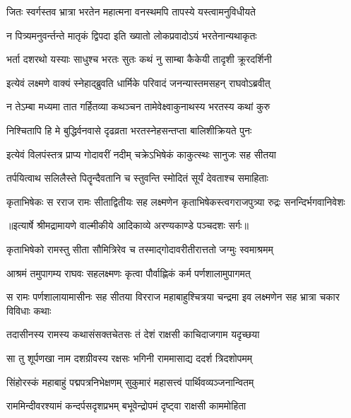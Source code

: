 \twolineshloka
{जितः स्वर्गस्तव भ्रात्रा भरतेन महात्मना}
{वनस्थमपि तापस्ये यस्त्वामनुविधीयते} %

\twolineshloka
{न पित्र्यमनुवर्न्तन्ते मातृकं द्विपदा इति}
{ख्यातो लोकप्रवादोऽयं भरतेनान्यथाकृतः} %

\twolineshloka
{भर्ता दशरथो यस्याः साधुश्च भरतः सुतः}
{कथं नु साम्बा कैकेयी तादृशी क्रूरदर्शिनी} %

\twolineshloka
{इत्येवं लक्ष्मणे वाक्यं स्नेहाद्ब्रुवति धार्मिके}
{परिवादं जनन्यास्तमसहन् राघवोऽब्रवीत्} %

\twolineshloka
{न तेऽम्बा मध्यमा तात गर्हितव्या कथञ्चन}
{तामेवेक्ष्वाकुनाथस्य भरतस्य कथां कुरु} %

\twolineshloka
{निश्चितापि हि मे बुद्धिर्वनवासे दृढव्रता}
{भरतस्नेहसन्तप्ता बालिशीक्रियते पुनः} %

\twolineshloka
{इत्येवं विलपंस्तत्र प्राप्य गोदावरीं नदीम्}
{चक्रेऽभिषेकं काकुत्स्थः सानुजः सह सीतया} %

\twolineshloka
{तर्पयित्वाथ सलिलैस्ते पितॄन्दैवतानि च}
{स्तुवन्ति स्मोदितं सूर्यं देवताश्च समाहिताः} %

\fourlineindentedshloka
{कृताभिषेकः स रराज रामः}
{सीताद्वितीयः सह लक्ष्मणेन}
{कृताभिषेकस्त्वगराजपुत्र्या}
{रुद्रः सनन्दिर्भगवानिवेशः} %


{॥इत्यार्षे श्रीमद्रामायणे वाल्मीकीये आदिकाव्ये अरण्यकाण्डे पञ्चदशः सर्गः॥}


\twolineshloka
{कृताभिषेको रामस्तु सीता सौमित्रिरेव च}
{तस्माद्गोदावरीतीरात्ततो जग्मुः स्वमाश्रमम्} %

\twolineshloka
{आश्रमं तमुपागम्य राघवः सहलक्ष्मणः}
{कृत्वा पौर्वाह्णिकं कर्म पर्णशालामुपागमत्} %

\threelineshloka
{स रामः पर्णशालायामासीनः सह सीतया}
{विरराज महाबाहुश्चित्रया चन्द्रमा इव}
{लक्ष्मणेन सह भ्रात्रा चकार विविधाः कथाः} %

\twolineshloka
{तदासीनस्य रामस्य कथासंसक्तचेतसः}
{तं देशं राक्षसी काचिदाजगाम यदृच्छया} %

\twolineshloka
{सा तु शूर्पणखा नाम दशग्रीवस्य रक्षसः}
{भगिनी राममासाद्य ददर्श त्रिदशोपमम्} %

\twolineshloka
{सिंहोरस्कं महाबाहुं पद्मपत्रनिभेक्षणम्}
{सुकुमारं महासत्त्वं पार्थिवव्यञ्जनान्वितम्} %

\twolineshloka
{राममिन्दीवरश्यामं कन्दर्पसदृशप्रभम्}
{बभूवेन्द्रोपमं दृष्ट्वा राक्षसी काममोहिता} %

